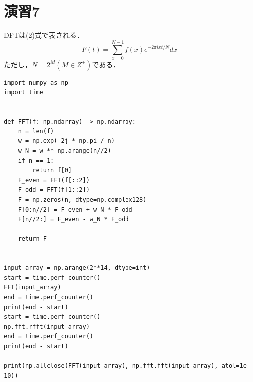 \documentclass[11pt,a4j]{jarticle}%
\begin{document}
\section{演習7}
DFTは(2)式で表される．
\begin{equation}
  F(t) = \sum_{x=0}^{N-1} f(x)e^{-2\pi ixt/N}dx
\end{equation}
ただし，$N=2^M(M\in Z^+)$である．
\begin{lstlisting}[caption=FFT実装,label=prog1]
import numpy as np
import time


def FFT(f: np.ndarray) -> np.ndarray:
    n = len(f)
    w = np.exp(-2j * np.pi / n)
    w_N = w ** np.arange(n//2)
    if n == 1:
        return f[0]
    F_even = FFT(f[::2])
    F_odd = FFT(f[1::2])
    F = np.zeros(n, dtype=np.complex128)
    F[0:n//2] = F_even + w_N * F_odd
    F[n//2:] = F_even - w_N * F_odd

    return F


input_array = np.arange(2**14, dtype=int)
start = time.perf_counter()
FFT(input_array)
end = time.perf_counter()
print(end - start)
start = time.perf_counter()
np.fft.rfft(input_array)
end = time.perf_counter()
print(end - start)

print(np.allclose(FFT(input_array), np.fft.fft(input_array), atol=1e-10))
\end{lstlisting}
\end{document}
